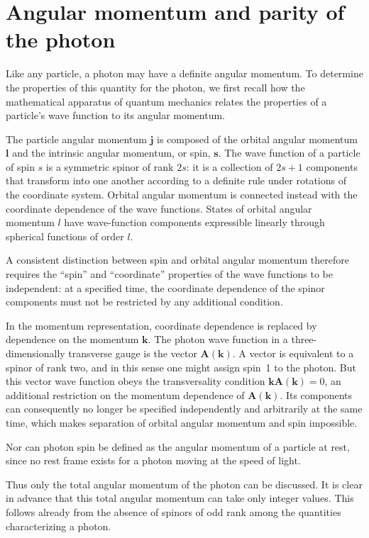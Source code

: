 \section{Angular momentum and parity of the photon}

Like any particle, a photon may have a definite angular momentum. To determine the properties of this quantity for the photon, we first recall how the mathematical apparatus of quantum mechanics relates the properties of a particle's wave function to its angular momentum.

The particle angular momentum $\mathbf{j}$ is composed of the orbital angular momentum $\mathbf{l}$ and the intrinsic angular momentum, or spin, $\mathbf{s}$. The wave function of a particle of spin $s$ is a symmetric spinor of rank $2s$: it is a collection of $2s + 1$ components that transform into one another according to a definite rule under rotations of the coordinate system. Orbital angular momentum is connected instead with the coordinate dependence of the wave functions. States of orbital angular momentum $l$ have wave-function components expressible linearly through spherical functions of order $l$.

A consistent distinction between spin and orbital angular momentum therefore requires the ``spin'' and ``coordinate'' properties of the wave functions to be independent: at a specified time, the coordinate dependence of the spinor components must not be restricted by any additional condition.

In the momentum representation, coordinate dependence is replaced by dependence on the momentum $\mathbf{k}$. The photon wave function in a three-dimensionally transverse gauge is the vector $\mathbf{A}(\mathbf{k})$. A vector is equivalent to a spinor of rank two, and in this sense one might assign spin~1 to the photon. But this vector wave function obeys the transversality condition $\mathbf{kA}(\mathbf{k}) = 0$, an additional restriction on the momentum dependence of $\mathbf{A}(\mathbf{k})$. Its components can consequently no longer be specified independently and arbitrarily at the same time, which makes separation of orbital angular momentum and spin impossible.

Nor can photon spin be defined as the angular momentum of a particle at rest, since no rest frame exists for a photon moving at the speed of light.

Thus only the total angular momentum of the photon can be discussed. It is clear in advance that this total angular momentum can take only integer values. This follows already from the absence of spinors of odd rank among the quantities characterizing a photon.

